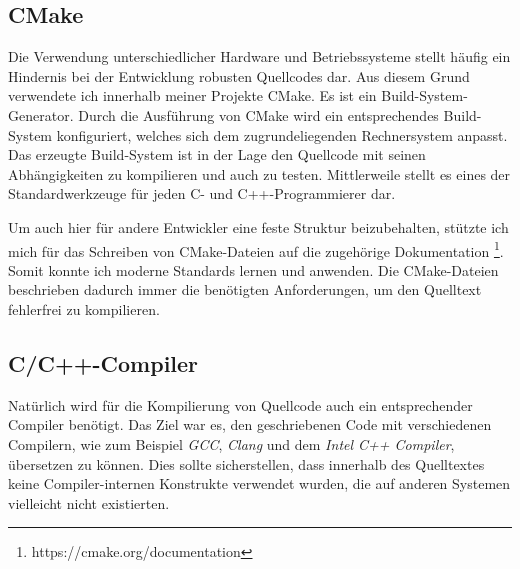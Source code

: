 \documentclass[crop=false]{standalone}
\begin{document}
  \subsection{CMake} %
  \label{sub:cmake}
    Die Verwendung unterschiedlicher Hardware und Betriebssysteme stellt häufig ein Hindernis bei der Entwicklung robusten Quellcodes dar.
    Aus diesem Grund verwendete ich innerhalb meiner Projekte CMake.
    Es ist ein Build-System-Generator.
    Durch die Ausführung von CMake wird ein entsprechendes Build-System konfiguriert, welches sich dem zugrundeliegenden Rechnersystem anpasst.
    Das erzeugte Build-System ist in der Lage den Quellcode mit seinen Abhängigkeiten zu kompilieren und auch zu testen.
    Mittlerweile stellt es eines der Standardwerkzeuge für jeden C- und C++-Programmierer dar.

    Um auch hier für andere Entwickler eine feste Struktur beizubehalten, stützte ich mich für das Schreiben von CMake-Dateien auf die zugehörige Dokumentation%
    \footnote{https://cmake.org/documentation}.
    Somit konnte ich moderne Standards lernen und anwenden.
    Die CMake-Dateien beschrieben dadurch immer die benötigten Anforderungen, um den Quelltext fehlerfrei zu kompilieren.

  \subsection{C/C++-Compiler} %
  \label{sub:c_c_compiler}
    Natürlich wird für die Kompilierung von Quellcode auch ein entsprechender Compiler benötigt.
    Das Ziel war es, den geschriebenen Code mit verschiedenen Compilern, wie zum Beispiel \textit{GCC}, \textit{Clang} und dem \textit{Intel C++ Compiler}, übersetzen zu können.
    Dies sollte sicherstellen, dass innerhalb des Quelltextes keine Compiler-internen Konstrukte verwendet wurden, die auf anderen Systemen vielleicht nicht existierten.
\end{document}
